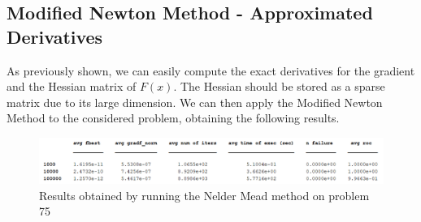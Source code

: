 \subsection*{Modified Newton Method - Approximated Derivatives}
As previously shown, we can easily compute the exact derivatives for the gradient and the Hessian matrix of $F(x)$. The Hessian should be stored
as a sparse matrix due to its large dimension. We can then apply the Modified Newton Method to the considered problem, obtaining the following 
results. 
\begin{figure}[H]
    \centering
    \includegraphics[width=1\textwidth]{img/pb75_table_MN.png}
    \caption{Results obtained by running the Nelder Mead method on problem 75} 
    \label{pb 75 table MN}
\end{figure}